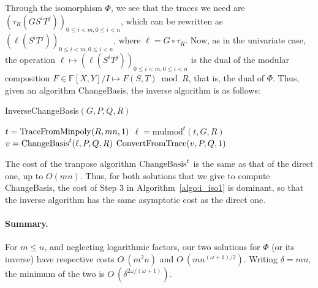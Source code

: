\documentclass[12pt]{article}
\def\F {\ensuremath{\mathbb{F}}}
\def\mulmod {\ensuremath{\mathrm{mulmod}}}
\begin{document}
Through the isomorphism $\Phi$, we see that the traces we need are
$(\tau_R(G S^i T^j))_{0 \le i < m, 0 \le i < n}$, which can be
rewritten as $(\ell(S^i T^j))_{0 \le i < m, 0 \le i < n}$, where $\ell
= G \circ \tau_R$. Now, as in the univariate case, the operation $\ell
\mapsto (\ell(S^i T^j))_{0 \le i < m, 0 \le i < n}$ is the dual of the
modular composition $F \in \F[X,Y]/I \mapsto F(S,T) \bmod R$, that is,
the dual of $\Phi$. Thus, given an algorithm ChangeBasis, the inverse
algorithm is as follows:


\begin{algorithm}[H]
  \caption{InverseChangeBasis$(G,P,Q,R)$}
  \begin{algorithmic}[1]
   \STATE $t = {\rm TraceFromMinpoly}(R, mn, 1)$
   \STATE $\ell =\mulmod^t(t, G, R)$
   \STATE $v = {\rm ChangeBasis}^t(\ell, P, Q, R)$
   \RETURN ${\rm ConvertFromTrace}(v, P, Q, 1)$
  \end{algorithmic}
  \label{algo:i_iso1}
\end{algorithm}

The cost of the tranpose algorithm ${\rm ChangeBasis}^t$ is the same
as that of the direct one, up to $O(mn)$. Thus, for both solutions
that we give to compute ChangeBasis, the cost of Step 3 in
Algorithm~\ref{algo:i_iso1} is dominant, so that the inverse algorithm
has the same asymptotic cost as the direct one.

\paragraph{Summary.} For $m \le n$, and neglecting logarithmic factors,
our two solutions for $\Phi$ (or its inverse) have respective costs
$O\tilde{~}(m^2 n)$ and $O\tilde{~}(m n^{(\omega+1)/2})$. Writing
$\delta=mn$, the minimum of the two is
$O\tilde{~}(\delta^{2\omega/(\omega+1)})$.



 
\end{document}
